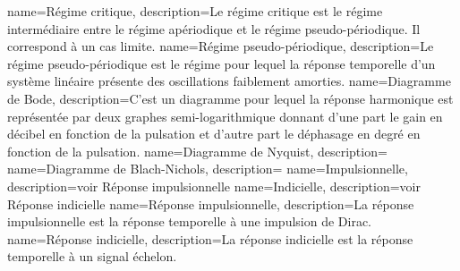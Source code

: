 %
{%
  name={Régime critique},%
  description={Le régime critique est le régime intermédiaire entre le régime
      apériodique et le régime pseudo-périodique. Il correspond à un cas limite.
  }
}
%
{%
  name={Régime pseudo-périodique},%
  description={Le régime pseudo-périodique est le régime pour lequel la réponse
  temporelle d'un système linéaire présente des oscillations faiblement 
  amorties.
  }
}
%
{%
  name={Diagramme de Bode},%
  description={C'est un diagramme pour lequel la réponse harmonique est 
  représentée par deux graphes semi-logarithmique donnant d'une part le gain 
  en décibel en fonction de la pulsation et d'autre part le déphasage en degré
  en fonction de la pulsation.
  }
}
%
{%
  name={Diagramme de Nyquist},%
  description={
  }
}
%
{%
  name={Diagramme de Blach-Nichols},%
  description={
  }
}
%
{%
  name={Impulsionnelle},%
  description={voir Réponse impulsionnelle
  }
}
%
{%
  name={Indicielle},%
  description={voir Réponse indicielle
  }
}
%
{%
  name={Réponse impulsionnelle},%
  description={La réponse impulsionnelle est la réponse temporelle
  à une impulsion de Dirac.
  }
}
%
{%
  name={Réponse indicielle},%
  description={La réponse indicielle est la réponse temporelle
  à un signal échelon.
  }
}

